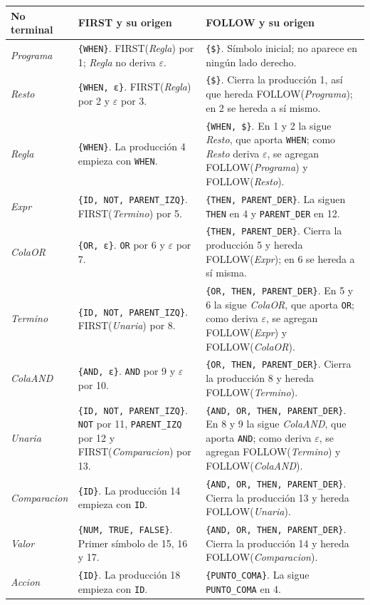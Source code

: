 \documentclass[11pt,a4paper]{article}
\newcommand{\tk}[1]{\texttt{#1}}
\newcommand{\nt}[1]{\textit{#1}}
\begin{document}
\begin{xltabular}{\textwidth}{l Y{0.8} Y{1.2}}
  \toprule
  \textbf{No terminal} & \textbf{FIRST y su origen}
  & \textbf{FOLLOW y su origen}
  \\
  \midrule
  \endhead
  \nt{Programa}        & \tk{\{WHEN\}}. FIRST(\nt{Regla}) por 1;
  \nt{Regla} no deriva $\varepsilon$.
  & \tk{\{\$\}}. Símbolo inicial; no aparece en ningún lado
  derecho.
  \\
  \nt{Resto}           & \tk{\{WHEN, ε\}}. FIRST(\nt{Regla}) por 2
  y $\varepsilon$ por 3.
  & \tk{\{\$\}}. Cierra la producción 1, así que hereda
  FOLLOW(\nt{Programa}); en 2 se hereda a sí mismo.
  \\
  \nt{Regla}           & \tk{\{WHEN\}}. La producción 4 empieza con
  \tk{WHEN}.
  & \tk{\{WHEN, \$\}}. En 1 y 2 la sigue \nt{Resto}, que aporta
  \tk{WHEN}; como \nt{Resto} deriva $\varepsilon$, se agregan
  FOLLOW(\nt{Programa}) y FOLLOW(\nt{Resto}).               \\
  \nt{Expr}            & \tk{\{ID, NOT, PARENT\_IZQ\}}.
  FIRST(\nt{Termino}) por 5.
  & \tk{\{THEN, PARENT\_DER\}}. La siguen \tk{THEN} en 4 y
  \tk{PARENT\_DER} en 12.
  \\
  \nt{ColaOR}          & \tk{\{OR, ε\}}. \tk{OR} por 6 y
  $\varepsilon$ por 7.
  & \tk{\{THEN, PARENT\_DER\}}. Cierra la producción 5 y hereda
  FOLLOW(\nt{Expr}); en 6 se hereda a sí misma.
  \\
  \nt{Termino}         & \tk{\{ID, NOT, PARENT\_IZQ\}}.
  FIRST(\nt{Unaria}) por 8.
  & \tk{\{OR, THEN, PARENT\_DER\}}. En 5 y 6 la sigue \nt{ColaOR},
  que aporta \tk{OR}; como deriva $\varepsilon$, se agregan
  FOLLOW(\nt{Expr}) y FOLLOW(\nt{ColaOR}).                 \\
  \nt{ColaAND}         & \tk{\{AND, ε\}}. \tk{AND} por 9 y
  $\varepsilon$ por 10.
  & \tk{\{OR, THEN, PARENT\_DER\}}. Cierra la producción 8 y hereda
  FOLLOW(\nt{Termino}).
  \\
  \nt{Unaria}          & \tk{\{ID, NOT, PARENT\_IZQ\}}. \tk{NOT}
  por 11, \tk{PARENT\_IZQ} por 12 y FIRST(\nt{Comparacion}) por 13.
  & \tk{\{AND, OR, THEN, PARENT\_DER\}}. En 8 y 9 la sigue
  \nt{ColaAND}, que aporta \tk{AND}; como deriva $\varepsilon$, se
  agregan FOLLOW(\nt{Termino}) y FOLLOW(\nt{ColaAND}).         \\
  \nt{Comparacion}     & \tk{\{ID\}}. La producción 14 empieza con
  \tk{ID}.
  & \tk{\{AND, OR, THEN, PARENT\_DER\}}. Cierra la producción 13 y
  hereda FOLLOW(\nt{Unaria}).
  \\
  \nt{Valor}           & \tk{\{NUM, TRUE, FALSE\}}. Primer símbolo
  de 15, 16 y 17.
  & \tk{\{AND, OR, THEN, PARENT\_DER\}}. Cierra la producción 14 y
  hereda FOLLOW(\nt{Comparacion}).
  \\
  \nt{Accion}          & \tk{\{ID\}}. La producción 18 empieza con
  \tk{ID}.
  & \tk{\{PUNTO\_COMA\}}. La sigue \tk{PUNTO\_COMA} en 4.
  \\
  \bottomrule
\end{xltabular}
\end{document}
